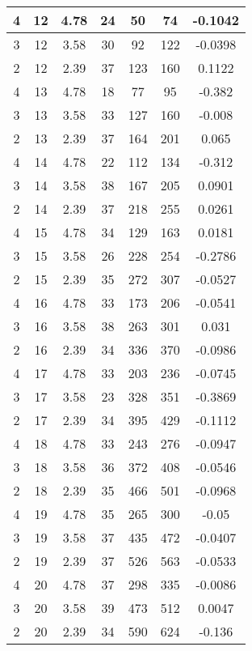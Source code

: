 \documentclass[letterpaper, 12pt]{article}
\begin{document}
\begin{longtable}{|c|c|c|c|c|c|c|}
\hline
4 & 12 & 4.78 & 24 & 50 & 74 & -0.1042 \\
\hline
3 & 12 & 3.58 & 30 & 92 & 122 & -0.0398 \\
\hline
2 & 12 & 2.39 & 37 & 123 & 160 & 0.1122 \\
\hline
4 & 13 & 4.78 & 18 & 77 & 95 & -0.382 \\
\hline
3 & 13 & 3.58 & 33 & 127 & 160 & -0.008 \\
\hline
2 & 13 & 2.39 & 37 & 164 & 201 & 0.065 \\
\hline
4 & 14 & 4.78 & 22 & 112 & 134 & -0.312 \\
\hline
3 & 14 & 3.58 & 38 & 167 & 205 & 0.0901 \\
\hline
2 & 14 & 2.39 & 37 & 218 & 255 & 0.0261 \\
\hline
4 & 15 & 4.78 & 34 & 129 & 163 & 0.0181 \\
\hline
3 & 15 & 3.58 & 26 & 228 & 254 & -0.2786 \\
\hline
2 & 15 & 2.39 & 35 & 272 & 307 & -0.0527 \\
\hline
4 & 16 & 4.78 & 33 & 173 & 206 & -0.0541 \\
\hline
3 & 16 & 3.58 & 38 & 263 & 301 & 0.031 \\
\hline
2 & 16 & 2.39 & 34 & 336 & 370 & -0.0986 \\
\hline
4 & 17 & 4.78 & 33 & 203 & 236 & -0.0745 \\
\hline
3 & 17 & 3.58 & 23 & 328 & 351 & -0.3869 \\
\hline
2 & 17 & 2.39 & 34 & 395 & 429 & -0.1112 \\
\hline
4 & 18 & 4.78 & 33 & 243 & 276 & -0.0947 \\
\hline
3 & 18 & 3.58 & 36 & 372 & 408 & -0.0546 \\
\hline
2 & 18 & 2.39 & 35 & 466 & 501 & -0.0968 \\
\hline
4 & 19 & 4.78 & 35 & 265 & 300 & -0.05 \\
\hline
3 & 19 & 3.58 & 37 & 435 & 472 & -0.0407 \\
\hline
2 & 19 & 2.39 & 37 & 526 & 563 & -0.0533 \\
\hline
4 & 20 & 4.78 & 37 & 298 & 335 & -0.0086 \\
\hline
3 & 20 & 3.58 & 39 & 473 & 512 & 0.0047 \\
\hline
2 & 20 & 2.39 & 34 & 590 & 624 & -0.136 \\
\hline
\end{longtable}
\end{document}
